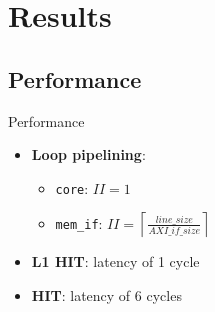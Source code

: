 \documentclass[handout,aspectratio=169]{beamer}
\begin{document}
\section{Results}
\subsection{Performance}
\begin{frame}{Performance}
	\begin{itemize}
		\item \textbf{Loop pipelining}:
			\begin{itemize}
				\item \texttt{core}: $II=1$
				\item \texttt{mem\_if}: $II=\left\lceil \frac{line\_size}{AXI\_if\_size} \right\rceil$
			\end{itemize}
		\item \textbf{L1 HIT}: latency of 1 cycle
		\item \textbf{HIT}: latency of 6 cycles
	\end{itemize}
\end{frame}
\end{document}
